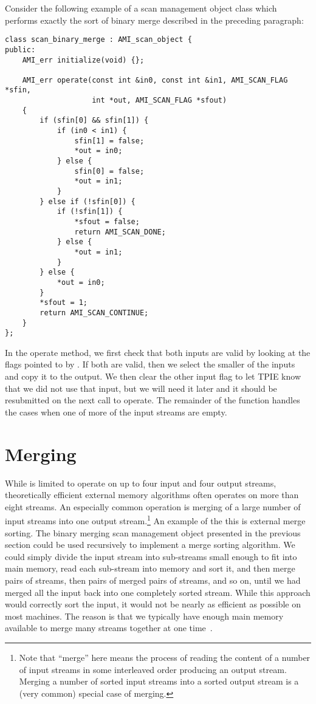 Consider the following example of a scan management object class which
performs exactly the sort of binary
merge described in the
preceding paragraph:

\begin{verbatim}
class scan_binary_merge : AMI_scan_object {
public:
    AMI_err initialize(void) {};
    
    AMI_err operate(const int &in0, const int &in1, AMI_SCAN_FLAG *sfin,
                    int *out, AMI_SCAN_FLAG *sfout) 
    {
        if (sfin[0] && sfin[1]) {
            if (in0 < in1) {
                sfin[1] = false;
                *out = in0;
            } else {
                sfin[0] = false;
                *out = in1;
            }
        } else if (!sfin[0]) {
            if (!sfin[1]) {
                *sfout = false;
                return AMI_SCAN_DONE;
            } else {
                *out = in1;
            }
        } else {
            *out = in0;
        }
        *sfout = 1;
        return AMI_SCAN_CONTINUE;
    }
};
\end{verbatim}

In the operate method, we first check that both inputs are valid by
looking at the flags pointed to by .  If both are valid,
then we select the smaller of the inputs and copy it to the output.
We then clear the other input flag to let TPIE know that we did not
use that input, but we will need it later and it should be resubmitted
on the next call to operate. The remainder of the function handles
the cases when one of more of the input streams are empty.


\section{Merging} \label{sec:merging}

While  is limited to operate on up to four input and four
output streams, theoretically efficient external memory algorithms often
operates on more than eight streams. An especially common operation is
merging of a large number of input streams into one output
stream.\footnote{Note that ``merge'' here means the process of reading the
content of a number of input streams in some interleaved order producing an
output stream. Merging a number of sorted input streams into a sorted
output stream is a (very common) special case of merging.} An example of
the this is external merge sorting. The binary merging scan management
object presented in the previous section could be used recursively to
implement a merge sorting algorithm. We could
simply divide the input stream into sub-streams small enough to fit into
main memory, read each sub-stream into memory and sort it, and then merge
pairs of streams, then pairs of merged pairs of streams, and so on, until
we had merged all the input back into one completely sorted stream. While
this approach would correctly sort the input, it would not be nearly as
efficient as possible on most machines. The reason is that we typically
have enough main memory available to merge many streams together at one
time~\cite{aggarwal:input}.

